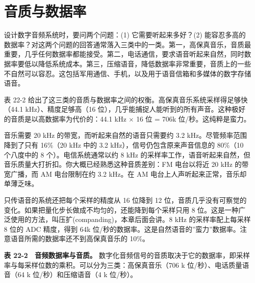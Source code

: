 \section{音质与数据率}

设计数字音频系统时，要问两个问题：(1) 它需要听起来多好？(2)
能容忍多高的数据率？对这两个问题的回答通常落入三类中的一类。第一，高保真音乐，音质最重要，几乎任何数据率都能接受。第二，电话通信，要求语音听起来自然，同时数据率要低以降低系统成本。第三，压缩语音，降低数据率非常重要，音质上的一些不自然可以容忍。这包括军用通信、手机，以及用于语音信箱和多媒体的数字存储语音。

表 22-2
给出了这三类的音质与数据率之间的权衡。高保真音乐系统采样得足够快（44.1
kHz）、精度足够高（16
位），几乎能捕捉人能听到的所有声音。这种极好的音质是以高数据率为代价的：44.1
kHz × 16 位 = 706k 位/秒。这纯粹是蛮力。

音乐需要 20 kHz 的带宽，而听起来自然的语音只需要约 3.2
kHz。尽管频率范围降到了只有 16\%（20 kHz 中的 3.2
kHz），信号仍包含原来声音信息的 80\%（10 个八度中的 8
个）。电信系统通常以约 8 kHz
的采样率工作，语音听起来自然，但音乐质量大打折扣。你大概已经熟悉这种音质差别：FM
电台以将近 20 kHz 的带宽广播，而 AM 电台限制在约 3.2 kHz。在 AM
电台上人声听起来正常，音乐却单薄乏味。

只传语音的系统还把每个采样的精度从 16 位降到 12
位，音质几乎没有可察觉的变化。如果把量化步长做成不均匀的，还能降到每个采样只用
8 位。这是一种广泛使用的方法，叫压扩(companding)，本章后面会讲。8 kHz
的采样率配上每采样 8 位的 ADC 精度，得到 64k
位/秒的数据率。这是自然语音的''蛮力''数据率。注意语音所需的数据率还不到高保真音乐的
10\%。

\textbf{表 22-2　音频数据率与音质。}
数字化音频信号的音质取决于它的数据率，即采样率与每采样位数的乘积。可以分为三类：高保真音乐（706
k 位/秒）、电话质量语音（64 k 位/秒）和压缩语音（4 k 位/秒）。

\begingroup\footnotesize\setlength{\tabcolsep}{3pt}


